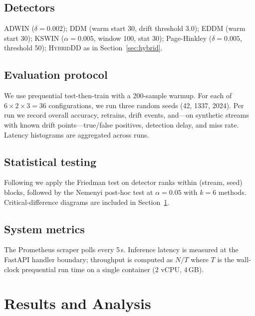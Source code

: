 \documentclass[conference]{IEEEtran}
\begin{document}
\subsection{Detectors}

ADWIN ($\delta=0.002$); DDM (warm start 30, drift threshold 3.0); EDDM (warm
start 30); KSWIN ($\alpha=0.005$, window 100, stat 30); Page-Hinkley
($\delta=0.005$, threshold 50); \textsc{HybridDD} as in Section~\ref{sec:hybrid}.

\subsection{Evaluation protocol}

We use prequential test-then-train with a 200-sample warmup. For each of
$6 \times 2 \times 3 = 36$ configurations, we run three random seeds
(42, 1337, 2024). Per run we record overall accuracy, retrains, drift events,
and---on synthetic streams with known drift points---true/false positives,
detection delay, and miss rate. Latency histograms are aggregated across
runs.

\subsection{Statistical testing}

Following \cite{demsar2006stat} we apply the Friedman test on detector ranks
within (stream, seed) blocks, followed by the Nemenyi post-hoc test at
$\alpha = 0.05$ with $k=6$ methods. Critical-difference diagrams are
included in Section~\ref{sec:results}.

\subsection{System metrics}

The Prometheus scraper polls every 5\,s. Inference latency is measured at the
FastAPI handler boundary; throughput is computed as
$N / T$ where $T$ is the wall-clock prequential run time on a single
container (2 vCPU, 4\,GB).

\section{Results and Analysis}
\label{sec:results}
\end{document}
